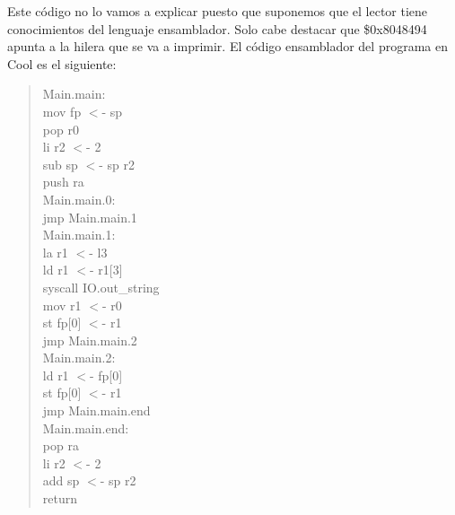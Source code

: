 \documentclass[10pt,a4paper]{article}
\begin{document}
Este código no lo vamos a explicar puesto que suponemos que el lector tiene conocimientos del lenguaje ensamblador. Solo cabe destacar que \$0x8048494 apunta a la hilera que se va a imprimir. El código ensamblador del programa en Cool es el siguiente:
\begin{quote}
Main.main:           \\
\vphantom{A} \hspace{2cm} mov fp $<$- sp\\
\vphantom{A} \hspace{2cm} pop r0\\
\vphantom{A} \hspace{2cm} li r2 $<$- 2\\
\vphantom{A} \hspace{2cm} sub sp $<$- sp r2\\
\vphantom{A} \hspace{2cm} push ra\\
Main.main.0:            \\
\vphantom{A} \hspace{2cm} jmp Main.main.1\\
Main.main.1:            \\
\vphantom{A} \hspace{2cm} la r1 $<$- l3\\
\vphantom{A} \hspace{2cm} ld r1 $<$- r1[3]\\
\vphantom{A} \hspace{2cm} syscall IO.out\_string\\
\vphantom{A} \hspace{2cm} mov r1 $<$- r0\\
\vphantom{A} \hspace{2cm} st fp[0] $<$- r1\\
\vphantom{A} \hspace{2cm} jmp Main.main.2\\
Main.main.2:           \\
\vphantom{A} \hspace{2cm} ld r1 $<$- fp[0]\\
\vphantom{A} \hspace{2cm} st fp[0] $<$- r1\\
\vphantom{A} \hspace{2cm} jmp Main.main.end\\
Main.main.end:          \\
\vphantom{A} \hspace{2cm} pop ra\\
\vphantom{A} \hspace{2cm} li r2 $<$- 2\\
\vphantom{A} \hspace{2cm} add sp $<$- sp r2\\
\vphantom{A} \hspace{2cm} return\\
\end{quote}
\end{document}
